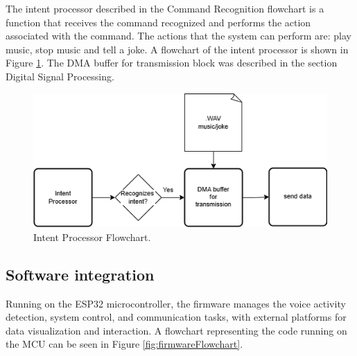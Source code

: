The intent processor described in the Command Recognition flowchart is a function that receives the command recognized and performs the action associated with the command. The actions that the system can perform are: play music, stop music and tell a joke. A flowchart of the intent processor is shown in Figure \ref{fig:intentProcessor}. The DMA buffer for transmission block was described in the section Digital Signal Processing.

\begin{figure}[H]
    \centering
    \includegraphics*[scale = 0.6]{Images/intentProcessor.png}
    \caption{Intent Processor Flowchart.}
    \label{fig:intentProcessor}
\end{figure}

\subsection{Software integration}
\label{sec:SoftwareInt}
Running on the ESP32 microcontroller, the firmware manages the voice activity detection, system control, and communication tasks, with external platforms for data visualization and interaction. A flowchart representing the code running on the MCU can be seen in Figure \ref{fig:firmwareFlowchart}. 

